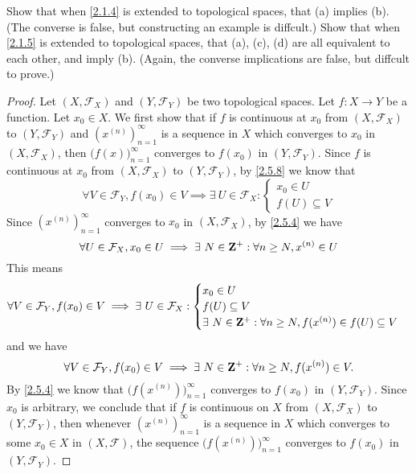 \begin{exercise}\label{ex 2.5.16}
  Show that when \cref{2.1.4} is extended to topological spaces, that (a) implies (b).
  (The converse is false, but constructing an example is diffcult.)
  Show that when \cref{2.1.5} is extended to topological spaces, that (a), (c), (d) are all equivalent to each other, and imply (b).
  (Again, the converse implications are false, but diffcult to prove.)
\end{exercise}

\begin{proof}
  Let \((X, \mathcal{F}_X)\) and \((Y, \mathcal{F}_Y)\) be two topological spaces.
  Let \(f : X \to Y\) be a function.
  Let \(x_0 \in X\).
  We first show that if \(f\) is continuous at \(x_0\) from \((X, \mathcal{F}_X)\) to \((Y, \mathcal{F}_Y)\) and \((x^{(n)})_{n = 1}^\infty\) is a sequence in \(X\) which converges to \(x_0\) in \((X, \mathcal{F}_X)\), then \(\big(f(x)\big)_{n = 1}^\infty\) converges to \(f(x_0)\) in \((Y, \mathcal{F}_Y)\).
  Since \(f\) is continuous at \(x_0\) from \((X, \mathcal{F}_X)\) to \((Y, \mathcal{F}_Y)\), by \cref{2.5.8} we know that
  \[
    \forall V \in \mathcal{F}_Y, f(x_0) \in V \implies \exists\ U \in \mathcal{F}_X : \begin{cases}
      x_0 \in U \\
      f(U) \subseteq V
    \end{cases}
  \]
  Since \((x^{(n)})_{n = 1}^\infty\) converges to \(x_0\) in \((X, \mathcal{F}_X)\), by \cref{2.5.4} we have
  \[
    \forall U \in \mathcal{F}_X, x_0 \in U \implies \exists\ N \in \mathbf{Z}^+ : \forall n \geq N, x^{(n)} \in U
  \]
  This means
  \[
    \forall V \in \mathcal{F}_Y, f(x_0) \in V \implies \exists\ U \in \mathcal{F}_X : \begin{cases}
      x_0 \in U        \\
      f(U) \subseteq V \\
      \exists\ N \in \mathbf{Z}^+ : \forall n \geq N, f(x^{(n)}) \in f(U) \subseteq V
    \end{cases}
  \]
  and we have
  \[
    \forall V \in \mathcal{F}_Y, f(x_0) \in V \implies \exists\ N \in \mathbf{Z}^+ : \forall n \geq N, f(x^{(n)}) \in V.
  \]
  By \cref{2.5.4} we know that \(\big(f(x^{(n)})\big)_{n = 1}^\infty\) converges to \(f(x_0)\) in \((Y, \mathcal{F}_Y)\).
  Since \(x_0\) is arbitrary, we conclude that if \(f\) is continuous on \(X\) from \((X, \mathcal{F}_X)\) to \((Y, \mathcal{F}_Y)\), then whenever \((x^{(n)})_{n = 1}^\infty\) is a sequence in \(X\) which converges to some \(x_0 \in X\) in \((X, \mathcal{F})\), the sequence \(\big(f(x^{(n)})\big)_{n = 1}^\infty\) converges to \(f(x_0)\) in \((Y, \mathcal{F}_Y)\).


\end{proof}
